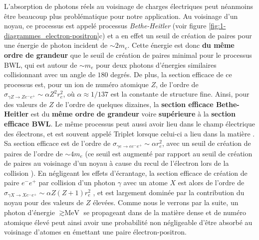 \begin{refsection}
L'absorption de photons réels au voisinage de charges électriques peut néanmoins être beaucoup plus problématique pour notre application. Au voisinage d'un noyau, ce processus est appelé processus \textit{Bethe-Heitler} (voir figure \ref{fig:1-diagrammes_electron-positron}c) et a en effet un seuil de création de paires pour une énergie de photon incident de $\sim 2 m_e$. Cette énergie est donc \textbf{du même ordre de grandeur} que le seuil de création de paires minimal pour le processus BWL, qui est autour de $\sim m_e$ pour deux photons d'énergies similaires collisionnant avec un angle de $180$ degrés. De plus, la section efficace de ce processus est, pour un ion de numéro atomique $Z$, de l'ordre de \parencite{carron_2007, ruffini_2010} $\sigma_{\gamma Z \to Z e^- e^+} \sim \alpha Z^2 r_e^2$, où $\alpha \approx 1/137$ est la constante de structure fine. Ainsi, pour des valeurs de $Z$ de l'ordre de quelques dizaines, la \textbf{section efficace Bethe-Heitler} est du \textbf{même ordre de grandeur} voire \textbf{supérieure} à la \textbf{section efficace BWL}. Le même processus peut aussi avoir lieu dans le champ électrique des électrons, et est souvent appelé Triplet lorsque celui-ci a lieu dans la matière \parencite{carron_2007, hubbell_2006}. Sa section efficace est de l'ordre de $\sigma_{\gamma e \to e e^- e^+} \sim \alpha r_e^2$, avec un seuil de création de paires de l'ordre de $\sim 4 m_e$ (ce seuil est augmenté par rapport au seuil de création de paires au voisinage d'un noyau à cause du recul de l'électron lors de la collision \parencite{carron_2007}). En négligeant les effets d'écrantage, la section efficace de création de paire $e^-e^+$ par collision d'un photon $\gamma$ avec un atome $X$ est alors de l'ordre de $\sigma_{\gamma X \to X e^- e^+} \sim \alpha Z (Z+1) r_e^2$ \parencite{carron_2007}, et est largement dominée par la contribution du noyau pour des valeurs de $Z$ élevées. Comme nous le verrons par la suite, un photon d'énergie $\gtrsim \si{\MeV}$ se propageant dans de la matière dense et de numéro atomique élevé peut ainsi avoir une probabilité non négligeable d'être absorbé au voisinage d'atomes en émettant une paire électron-positron. 



\end{refsection}
